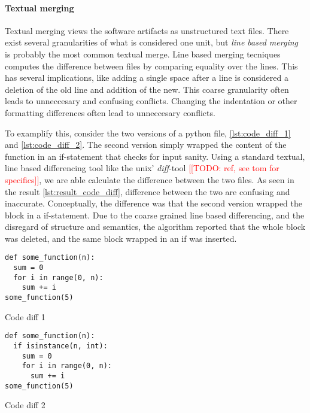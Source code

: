 \documentclass[a4paper,english]{ifimaster}
\newcommand{\todo}[1]{\textcolor{red}{[[TODO: #1]]}\PackageWarning{TODO:}{#1!}}
\begin{document}
\paragraph{Textual merging}%
\label{par:textual_merging}

Textual merging views the software artifacts as unstructured text files. There exist several granularities of what is considered one unit, but \textit{line based merging} is probably the most common textual merge. Line based merging tecniques computes the difference between files by comparing equality over the lines. This has several implications, like adding a single space after a line is considered a deletion of the old line and addition of the new. This coarse granularity often leads to unneccesary and confusing conflicts. Changing the indentation or other formatting differences often lead to unneccesary conflicts.

To examplify this, consider the two versions of a python file, \ref{lst:code_diff_1} and \ref{lst:code_diff_2}. The second version simply wrapped the content of the function in an if-statement that checks for input sanity. Using a standard textual, line based differencing tool like the unix' \textit{diff}-tool \todo{ref, see tom for specifics}, we are able calculate the difference between the two files. As seen in the result \ref{lst:result_code_diff}, difference between the two are confusing and inaccurate. Conceptually, the difference was that the second version wrapped the block in a if-statement. Due to the coarse grained line based differencing, and the disregard of structure and semantics, the algorithm reported that the whole block was deleted, and the same block wrapped in an if was inserted.

\begin{listing}
	\begin{verbatim}
def some_function(n):
  sum = 0
  for i in range(0, n):
    sum += i
some_function(5)

  \end{verbatim}
	\caption{Code diff 1}
	\label{lst:code_diff_1}
\end{listing}

\begin{listing}
	\begin{verbatim}
def some_function(n):
  if isinstance(n, int):
    sum = 0
    for i in range(0, n):
      sum += i
some_function(5)
  \end{verbatim}
	\caption{Code diff 2}
	\label{lst:code_diff_2}
\end{listing}
\end{document}
